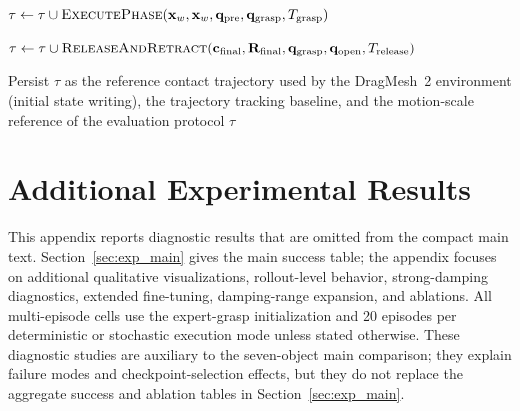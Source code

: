 \documentclass{llmxive}
\begin{document}
\begin{algorithm}[t]
\BlankLine
{}
$\tau \leftarrow \tau \cup
   \textsc{ExecutePhase}(\mathbf{x}_w,\mathbf{x}_w,
   \mathbf{q}_{\mathrm{pre}},\mathbf{q}_{\mathrm{grasp}},
   T_{\mathrm{grasp}})$\;

\BlankLine
{}

\BlankLine
{}
$\tau \leftarrow \tau \cup
   \textsc{ReleaseAndRetract}(
   \mathbf{c}_{\mathrm{final}},\mathbf{R}_{\mathrm{final}},
   \mathbf{q}_{\mathrm{grasp}},\mathbf{q}_{\mathrm{open}},
   T_{\mathrm{release}})$\;

\BlankLine
Persist $\tau$ as the reference contact trajectory used by the
DragMesh~2 environment (initial state writing), the trajectory
tracking baseline, and the motion-scale reference of the evaluation
protocol\;
\Return $\tau$\;
\end{algorithm}

\section{Additional Experimental Results}
\label{sec:exp}

This appendix reports diagnostic results that are omitted from the
compact main text. Section~\ref{sec:exp_main} gives the main success
table; the appendix focuses on additional qualitative visualizations,
rollout-level behavior, strong-damping diagnostics, extended
fine-tuning, damping-range expansion, and ablations.
All multi-episode cells use the expert-grasp initialization and 20
episodes per deterministic or stochastic execution mode unless stated
otherwise. These diagnostic studies are auxiliary to the seven-object
main comparison; they explain failure modes and checkpoint-selection
effects, but they do not replace the aggregate success and ablation
tables in Section~\ref{sec:exp_main}.
\end{document}
